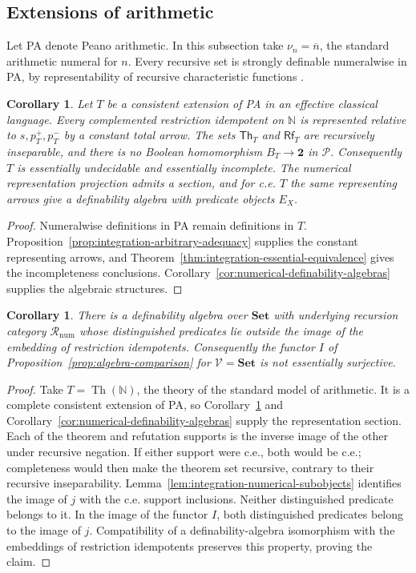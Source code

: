 \documentclass[11pt]{article}
\newtheorem{corollary}[theorem]{Corollary}
\theoremstyle{definition}
\theoremstyle{remark}
\begin{document}
\subsection{Extensions of arithmetic}
\label{sec:arithmetic-representation}

Let PA denote Peano arithmetic. In this subsection take
$\nu_n=\overline n$, the standard arithmetic numeral for $n$.
Every recursive set is strongly definable numeralwise in PA,
by representability of recursive characteristic functions
\cite[Section~16.2]{BBJ}.

\begin{corollary}\label{cor:arithmetic-representation-incompleteness}
Let $T$ be a consistent extension of PA in an effective classical
language. Every complemented restriction idempotent on $\mathbb N$
is represented relative to $s,p_T^+,p_T^-$ by a constant total arrow.
The sets $\mathsf{Th}_T$ and $\mathsf{Rf}_T$ are recursively inseparable,
and there is no Boolean homomorphism $B_T\to\mathbf2$ in $\mathcal P$.
Consequently $T$ is essentially undecidable and essentially incomplete.
The numerical representation projection admits a section, and
for c.e. $T$ the same representing arrows give a definability
algebra with predicate objects $E_X$.
\end{corollary}
\begin{proof}
Numeralwise definitions in PA remain definitions in $T$.
Proposition~\ref{prop:integration-arbitrary-adequacy} supplies
the constant representing arrows, and
Theorem~\ref{thm:integration-essential-equivalence} gives the incompleteness
conclusions. Corollary~\ref{cor:numerical-definability-algebras} supplies
the algebraic structures.
\end{proof}

\begin{corollary}\label{cor:proper-predicate-extension}
There is a definability algebra over $\mathbf{Set}$ with underlying
recursion category $\mathcal R_{\mathrm{num}}$ whose distinguished predicates lie
outside the image of the embedding of restriction idempotents. Consequently the
functor $I$ of Proposition~\ref{prop:algebra-comparison} for $\mathscr V=\mathbf{Set}$ is not essentially surjective.
\end{corollary}
\begin{proof}
Take $T=\operatorname{Th}(\mathbb N)$, the theory of the standard
model of arithmetic. It is a complete consistent extension of PA,
so Corollary~\ref{cor:arithmetic-representation-incompleteness}
and Corollary~\ref{cor:numerical-definability-algebras} supply
the representation section. Each of the theorem and refutation
supports is the inverse image of the other under recursive
negation. If either support were c.e., both would be c.e.;
completeness would then make the theorem set recursive,
contrary to their recursive inseparability.
Lemma~\ref{lem:integration-numerical-subobjects} identifies the
image of $j$ with the c.e. support inclusions. Neither
distinguished predicate belongs to it. In the image of the
functor $I$, both distinguished predicates belong to the image
of $j$. Compatibility of a definability-algebra isomorphism with
the embeddings of restriction idempotents preserves this property, proving the claim.
\end{proof}
\end{document}

